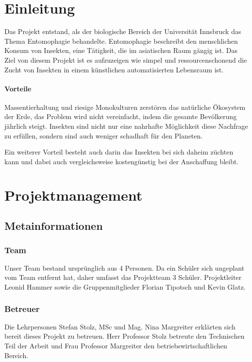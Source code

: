 \def \currentAuthor {} %

\chapter{Einleitung}

Das Projekt entstand, als der biologische Bereich der Universität Innsbruck das Thema Entomophagie behandelte. Entomophagie beschreibt den menschlichen Konsum von Insekten, eine Tätigkeit, die im asiatischen Raum gängig ist. Das Ziel von diesem Projekt ist es aufzuzeigen wie simpel und ressourcenschonend die Zucht von Insekten in einem künstlichen automatisierten Lebensraum ist.

\subsubsection{Vorteile}
Massentierhaltung und riesige Monokulturen zerstören das natürliche Ökosystem der Erde, das Problem wird nicht vereinfacht, indem die gesamte Bevölkerung jährlich steigt. Insekten sind nicht nur eine nahrhafte Möglichkeit diese Nachfrage zu erfüllen, sondern sind auch weniger schadhaft für den Planeten.

Ein weiterer Vorteil besteht auch darin das Insekten bei sich daheim züchten kann und dabei auch vergleichsweise kostengünstig bei der Anschaffung bleibt.




\chapter{Projektmanagement}

\section{Metainformationen}

\subsection{Team}
Unser Team bestand ursprünglich aus 4 Personen. Da ein Schüler sich ungeplant vom Team entfernt hat, daher umfasst das Projektteam 3 Schüler. Projektleiter Leonid Hammer sowie die Gruppenmitglieder Florian Tipotsch und Kevin Glatz.



\subsection{Betreuer}
Die Lehrpersonen Stefan Stolz, MSc und Mag. Nina Margreiter erklärten sich bereit dieses Projekt zu betreuen. Herr Professor Stolz betreute den Technischen Teil der Arbeit und Frau Professor Margreiter den betriebswirtschaftlichen Bereich.


